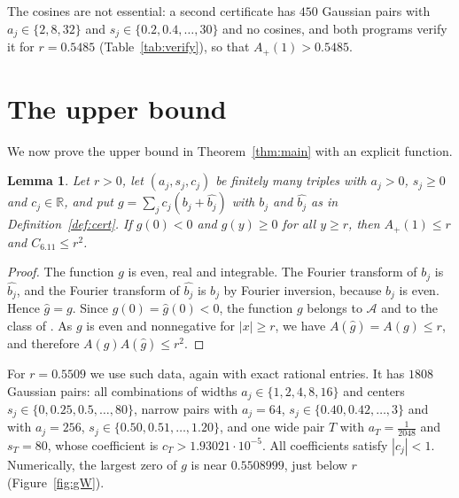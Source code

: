 \documentclass[11pt]{amsart}
\newtheorem{lemma}[theorem]{Lemma}
\theoremstyle{definition}
\theoremstyle{remark}
\numberwithin{equation}{section}
\newcommand{\R}{\mathbb{R}}
\newcommand{\cA}{\mathcal{A}}
\newcommand{\ft}[1]{\widehat{#1}}
\newcommand{\Ap}{A_+(1)}
\newcommand{\Csix}{C_{6.11}}
\newcommand{\rXdec}{0.5485}
\newcommand{\npairsX}{450}
\newcommand{\rPdec}{0.5509}
\newcommand{\npairsP}{1808}
\newcommand{\widthsP}{\{1,2,4,8,16\}}
\newcommand{\centersP}{\{0,0.25,0.5,\dots,80\}}
\newcommand{\smaxP}{80}
\newcommand{\aTP}{\tfrac{1}{2048}}
\newcommand{\cTP}{1.93021\cdot10^{-5}}
\begin{document}
The cosines are not essential: a second certificate has $\npairsX$ Gaussian pairs with $a_j\in\{2,8,32\}$ and $s_j\in\{0.2,0.4,\dots,30\}$ and no cosines, and both programs verify it for $r=\rXdec$ (Table~\ref{tab:verify}), so that $\Ap>\rXdec$.

\section{The upper bound}\label{sec:upper}

We now prove the upper bound in Theorem~\ref{thm:main} with an explicit function.

\begin{lemma}\label{lem:upper}
Let $r>0$, let $(a_j,s_j,c_j)$ be finitely many triples with $a_j>0$, $s_j\ge0$ and $c_j\in\R$, and put $g=\sum_jc_j(b_j+\ft{b_j})$ with $b_j$ and $\ft{b_j}$ as in Definition~\ref{def:cert}. If $g(0)<0$ and $g(y)\ge0$ for all $y\ge r$, then $\Ap\le r$ and $\Csix\le r^2$.
\end{lemma}

\begin{proof}
The function $g$ is even, real and integrable. The Fourier transform of $b_j$ is $\ft{b_j}$, and the Fourier transform of $\ft{b_j}$ is $b_j$ by Fourier inversion, because $b_j$ is even. Hence $\ft g=g$. Since $g(0)=\ft g(0)<0$, the function $g$ belongs to $\cA$ and to the class of \cite[Problem~6.11]{GGTW25}. As $g$ is even and nonnegative for $|x|\ge r$, we have $A(\ft g)=A(g)\le r$, and therefore $A(g)A(\ft g)\le r^2$.
\end{proof}

For $r=\rPdec$ we use such data, again with exact rational entries. It has $\npairsP$ Gaussian pairs: all combinations of widths $a_j\in\widthsP$ and centers $s_j\in\centersP$, narrow pairs with $a_j=64$, $s_j\in\{0.40,0.42,\dots,3\}$ and with $a_j=256$, $s_j\in\{0.50,0.51,\dots,1.20\}$, and one wide pair $T$ with $a_T=\aTP$ and $s_T=\smaxP$, whose coefficient is $c_T>\cTP$. All coefficients satisfy $|c_j|<1$. Numerically, the largest zero of $g$ is near $0.5508999$, just below $r$ (Figure~\ref{fig:gW}).
\end{document}
